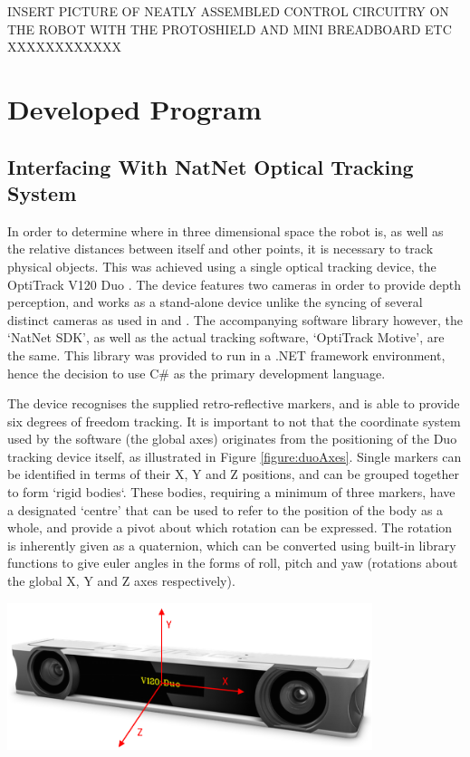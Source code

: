 \documentclass[11pt]{article}
\begin{document}
INSERT PICTURE OF NEATLY ASSEMBLED CONTROL CIRCUITRY ON THE ROBOT WITH THE PROTOSHIELD AND MINI BREADBOARD ETC XXXXXXXXXXXX

\pagebreak
\section{Developed Program}

\subsection{Interfacing With NatNet Optical Tracking System}
\label{section:natnet}
In order to determine where in three dimensional space the robot is, as well as the relative distances between itself and other points, it is necessary to track physical objects. This was achieved using a single optical tracking device, the OptiTrack V120 Duo \cite{OptiTrackSite}. The device features two cameras in order to provide depth perception, and works as a stand-alone device unlike the syncing of several distinct cameras as used in \cite{GreggSmithDesign} and \cite{GreggSmithFeedback}. The accompanying software library however, the `NatNet SDK', as well as the actual tracking software, `OptiTrack Motive', are the same. This library was provided to run in a .NET framework environment, hence the decision to use C\# as the primary development language.

The device recognises the supplied retro-reflective markers, and is able to provide six degrees of freedom tracking. It is important to not that the coordinate system used by the software (the global axes) originates from the positioning of the Duo tracking device itself, as illustrated in Figure \ref{figure:duoAxes}. Single markers can be identified in terms of their X, Y and Z positions, and can be grouped together to form `rigid bodies`. These bodies, requiring a minimum of three markers, have a designated `centre' that can be used to refer to the position of the body as a whole, and provide a pivot about which rotation can be expressed. The rotation is inherently given as a quaternion, which can be converted using built-in library functions to give euler angles in the forms of roll, pitch and yaw (rotations about the global X, Y and Z axes respectively).


\begin{center}
\includegraphics[width=0.8\textwidth]{images/duoAxes.png}
\label{figure:duoAxes}
\end{center}
\end{document}
